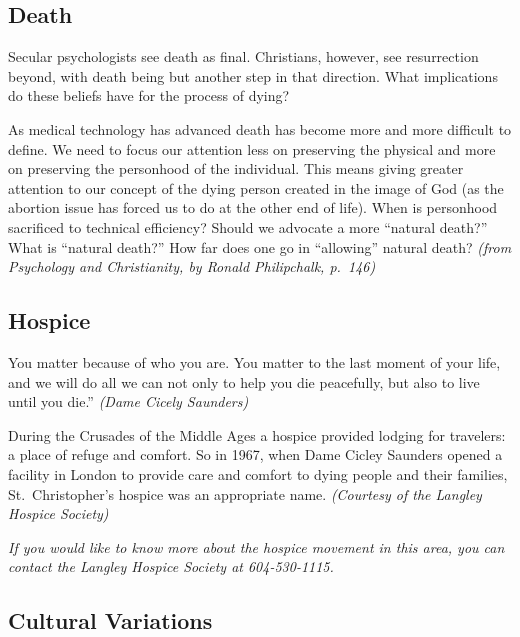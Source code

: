 \documentclass[
]{book}
\begin{document}
\hypertarget{death}{%
\subsection*{Death}\label{death}}

Secular psychologists see death as final. Christians, however, see resurrection beyond, with death being but another step in that direction. What implications do these beliefs have for the process of dying?

As medical technology has advanced death has become more and more difficult to define. We need to focus our attention less on preserving the physical and more on preserving the personhood of the individual. This means giving greater attention to our concept of the dying person created in the image of God (as the abortion issue has forced us to do at the other end of life). When is personhood sacrificed to technical efficiency? Should we advocate a more ``natural death?'' What is ``natural death?'' How far does one go in ``allowing'' natural death? \emph{(from Psychology and Christianity, by Ronald Philipchalk, p.~146)}

\hypertarget{hospice}{%
\subsection*{Hospice}\label{hospice}}

You matter because of who you are. You matter to the last moment of your life, and we will do all we can not only to help you die peacefully, but also to live until you die.'' \emph{(Dame Cicely Saunders)}

During the Crusades of the Middle Ages a hospice provided lodging for travelers: a place of refuge and comfort. So in 1967, when Dame Cicley Saunders opened a facility in London to provide care and comfort to dying people and their families, St.~Christopher's hospice was an appropriate name. \emph{(Courtesy of the Langley Hospice Society)}

\emph{If you would like to know more about the hospice movement in this area, you can contact the Langley Hospice Society at 604-530-1115.}

\hypertarget{cultural-variations}{%
\subsection*{Cultural Variations}\label{cultural-variations}}
\end{document}
